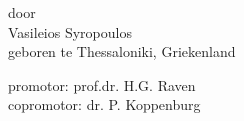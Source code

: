 \begin{titlepage}
\begin{center}
door\\
\vspace{0.5cm}
Vasileios Syropoulos\\
\vspace{0.5cm}
geboren te Thessaloniki, Griekenland

\end{center}

\clearpage

\begin{flushleft}
promotor: prof.dr. H.G. Raven\\
copromotor: dr. P. Koppenburg
\end{flushleft}

\vfill






\end{titlepage}
